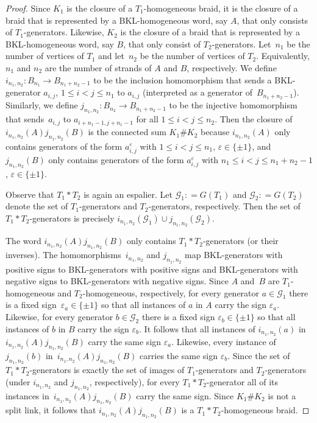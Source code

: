 \documentclass[10pt,a4paper]{amsart}
\newcommand{\defeq}{\mathrel{\mathop:}=}
\begin{document}
\begin{proof}
Since $K_1$ is the closure of a $T_1$-homogeneous braid, it is the closure of a braid that is represented by a BKL-homogeneous word, say $A$, that only consists of $T_1$-generators. Likewise, $K_2$ is the closure of a braid that is represented by a BKL-homogeneous word, say $B$, that only consist of $T_2$-generators.
Let~$n_1$ be the number of vertices of $T_1$ and let~$n_2$ be the number of vertices of $T_2$. Equivalently, $n_1$ and $n_2$ are the number of strands of $A$ and $B$, respectively.  We define $i_{n_1,n_2}:B_{n_1}\to B_{n_1+n_2-1}$ to be the inclusion homomorphism that sends a BKL-generator $a_{i,j}$, $1\leq i<j\leq n_1$ to $a_{i,j}$ (interpreted as a generator of~$B_{n_1+n_2-1}$). Similarly, we define $j_{n_1,n_2}:B_{n_2}\to B_{n_1+n_2-1}$ to be the injective homomorphism that sends~$a_{i,j}$ to $a_{i+n_1-1,j+n_1-1}$ for all $1\leq i<j\leq n_2$.
Then the closure of $i_{n_1,n_2}(A)j_{n_1,n_2}(B)$ is the connected sum $K_1\# K_2$ because $i_{n_1,n_2}(A)$ only contains generators of the form $a_{i,j}^{\varepsilon}$ with $1\leq i<j\leq n_1$, $\varepsilon\in\{\pm 1\}$, and $j_{n_1,n_2}(B)$ only contains generators of the form $a_{i,j}^{\varepsilon}$ with $n_1\leq i<j\leq n_1+n_2-1$, $\varepsilon\in\{\pm 1\}$.

Observe that $T_1*T_2$ is again an espalier. Let $\mathcal{G}_1 \defeq G(T_1)$ and $\mathcal{G}_2 \defeq G(T_2)$ denote the set of $T_1$-generators and $T_2$-generators, respectively. Then the set of $T_1*T_2$-generators is precisely $i_{n_1,n_2}(\mathcal{G}_1)\cup j_{n_1,n_2}(\mathcal{G}_2)$.

The word $i_{n_1,n_2}(A)j_{n_1,n_2}(B)$ only contains $T_1*T_2$-generators (or their inverses). The homomorphisms~$i_{n_1,n_2}$ and $j_{n_1,n_2}$ map BKL-generators with positive signs to BKL-generators with positive signs and BKL-generators with negative signs to BKL-generators with negative signs. Since $A$ and~$B$ are $T_1$-homogeneous and $T_2$-homogeneous, respectively, for every generator $a\in \mathcal{G}_1$ there is a fixed sign~$\varepsilon_a\in\{\pm 1\}$ so that all instances of $a$ in $A$ carry the sign $\varepsilon_a$. Likewise, for every generator $b\in \mathcal{G}_2$ there is a fixed sign $\varepsilon_b\in\{\pm 1\}$ so that all instances of $b$ in $B$ carry the sign $\varepsilon_b$. It follows that all instances of $i_{n_1,n_2}(a)$ in $i_{n_1,n_2}(A)j_{n_1,n_2}(B)$ carry the same sign $\varepsilon_a$. Likewise, every instance of $j_{n_1,n_2}(b)$ in~$i_{n_1,n_2}(A)j_{n_1,n_2}(B)$ carries the same sign $\varepsilon_b$. Since the set of $T_1*T_2$-generators is exactly the set of images of $T_1$-generators and $T_2$-generators (under $i_{n_1,n_2}$ and $j_{n_1,n_2}$, respectively), for every $T_1*T_2$-generator all of its instances in~$i_{n_1,n_2}(A)j_{n_1,n_2}(B)$ carry the same sign. Since $K_1\# K_2$ is not a split link, it follows that $i_{n_1,n_2}(A)j_{n_1,n_2}(B)$ is a $T_1*T_2$-homogeneous braid.
\end{proof}
\end{document}
